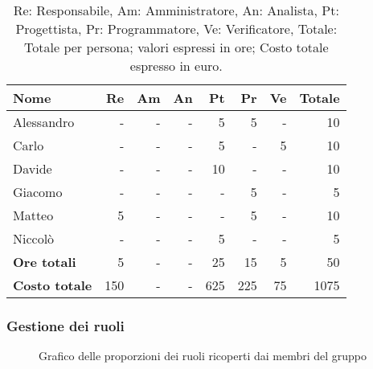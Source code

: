 \begin{table}[H]
	\centering
	\begin{tabular}{l|r|r|r|r|r|r|r}
		\textbf{Nome}         & \textbf{Re} & \textbf{Am} & \textbf{An} & \textbf{Pt} & \textbf{Pr} & \textbf{Ve} & \textbf{Totale} \\
		\hline
		Alessandro            & -           & -           & -           & 5           & 5           & -           & 10              \\
		Carlo                 & -           & -           & -           & 5           & -           & 5           & 10              \\
		Davide                & -           & -           & -           & 10          & -           & -           & 10              \\
		Giacomo               & -           & -           & -           & -           & 5           & -           & 5               \\
		Matteo                & 5           & -           & -           & -           & 5           & -           & 10              \\
		Niccolò               & -           & -           & -           & 5           & -           & -           & 5               \\
		\hline
		\textbf{Ore totali}   & 5           & -           & -           & 25          & 15          & 5           & 50              \\
		\textbf{Costo totale} & 150         & -           & -           & 625         & 225         & 75          & 1075
	\end{tabular}
	\caption{Re: Responsabile, Am: Amministratore, An: Analista, Pt: Progettista,
		Pr: Programmatore, Ve: Verificatore, Totale: Totale per persona; valori espressi in ore; Costo totale espresso in euro.}
\end{table}

\newpage
\subsubsection{Gestione dei ruoli}

\begin{figure}[h]
	\centering
	\caption{Grafico delle proporzioni dei ruoli ricoperti dai membri del gruppo}
\end{figure}

